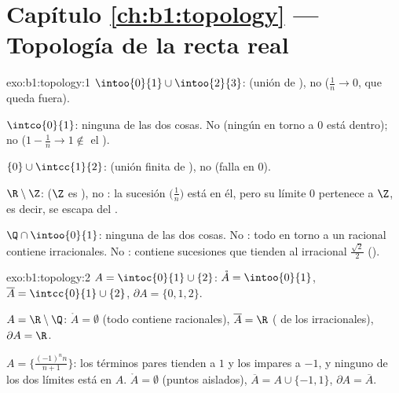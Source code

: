 \section*{Capítulo \ref{ch:b1:topology} --- Topología de la recta real}

\begin{solution}{exo:b1:topology:1}
$\intoo{0}{1} \cup \intoo{2}{3}$:  (unión de ), no
 ($\frac 1n \to 0$, que queda fuera).

$\intco{0}{1}$: ninguna de las dos cosas. No  (ningún
 en torno a $0$ está dentro); no 
($1 - \frac1n \to 1 \notin$ el ).

$\{0\} \cup \intcc{1}{2}$:  (unión finita de ), no
 (falla en $0$).

$\R \setminus \Z$:  ($\Z$ es ), no : la sucesión
$\bigl(\frac 1n\bigr)$ está en él, pero su límite $0$ pertenece a $\Z$,
es decir, se escapa del .

$\Q \cap \intoo{0}{1}$: ninguna de las dos cosas. No : todo
 en torno a un racional contiene irracionales. No :
contiene sucesiones que tienden al irracional $\frac{\sqrt 2}{2}$
().
\end{solution}

\begin{solution}{exo:b1:topology:2}
$A = \intoc{0}{1} \cup \{2\}$: $\mathring A = \intoo{0}{1}$,
$\overline A = \intcc{0}{1} \cup \{2\}$, $\partial A = \{0, 1, 2\}$.

$A = \R \setminus \Q$: $\mathring A = \emptyset$ (todo 
contiene racionales), $\overline A = \R$ ( de los
irracionales), $\partial A = \R$.

$A = \bigl\{\frac{(-1)^n n}{n+1}\bigr\}$: los términos pares tienden a
$1$ y los impares a $-1$, y ninguno de los dos límites está en $A$.
$\mathring A = \emptyset$ (puntos aislados),
$\overline A = A \cup \{-1, 1\}$, $\partial A = \overline A$.
\end{solution}

